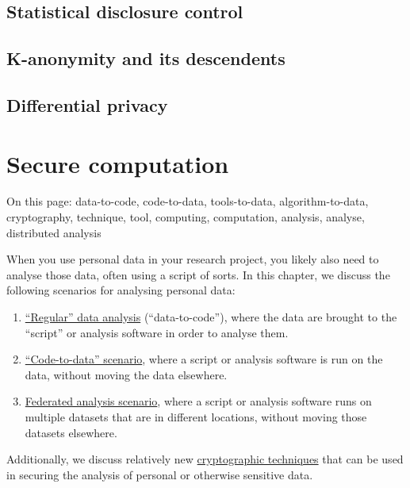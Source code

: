 \documentclass[
]{book}
\providecommand{\tightlist}{%
  \setlength{\itemsep}{0pt}\setlength{\parskip}{0pt}}
\begin{document}
\hypertarget{sdc}{%
\section{Statistical disclosure control}\label{sdc}}

\hypertarget{k-anonymity-and-its-descendents}{%
\section{K-anonymity and its descendents}\label{k-anonymity-and-its-descendents}}

\hypertarget{differential-privacy}{%
\section{Differential privacy}\label{differential-privacy}}

\hypertarget{secure-computation}{%
\chapter{Secure computation}\label{secure-computation}}

On this page: data-to-code, code-to-data, tools-to-data, algorithm-to-data,
cryptography, technique, tool, computing, computation, analysis, analyse,
distributed analysis

When you use personal data in your research project, you likely also need to
analyse those data, often using a script of sorts. In this chapter, we discuss
the following scenarios for analysing personal data:

\begin{enumerate}
\def\labelenumi{\arabic{enumi}.}
\tightlist
\item
  \protect\hyperlink{data-to-code}{``Regular'' data analysis} (``data-to-code''), where the data are
  brought to the ``script'' or analysis software in order to analyse them.
\item
  \protect\hyperlink{code-to-data}{``Code-to-data'' scenario}, where a script or analysis software
  is run on the data, without moving the data elsewhere.
\item
  \protect\hyperlink{federated-analysis}{Federated analysis scenario}, where a script or
  analysis software runs on multiple datasets that are in different locations,
  without moving those datasets elsewhere.
\end{enumerate}

Additionally, we discuss relatively new
\protect\hyperlink{computational-cryptography}{cryptographic techniques} that can be used in
securing the analysis of personal or otherwise sensitive data.
\end{document}
